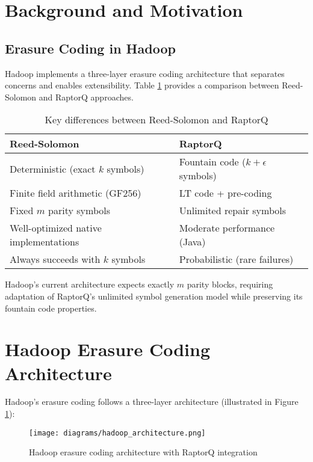 \documentclass{article}
\begin{document}
\section{Background and Motivation}

\subsection{Erasure Coding in Hadoop}

Hadoop implements a three-layer erasure coding architecture that separates concerns and enables extensibility. Table \ref{tab:comparison} provides a comparison between Reed-Solomon and RaptorQ approaches.

\begin{table}[h]
\centering
\begin{tabular}{|p{5cm}|p{5cm}|}
\hline
\textbf{Reed-Solomon} & \textbf{RaptorQ} \\\hline
Deterministic (exact $k$ symbols) & Fountain code ($k+\epsilon$ symbols) \\\hline
Finite field arithmetic (GF256) & LT code + pre-coding \\\hline
Fixed $m$ parity symbols & Unlimited repair symbols \\\hline
Well-optimized native implementations & Moderate performance (Java) \\\hline
Always succeeds with $k$ symbols & Probabilistic (rare failures) \\\hline
\end{tabular}
\caption{\label{tab:comparison}Key differences between Reed-Solomon and RaptorQ}
\end{table}

Hadoop's current architecture expects exactly $m$ parity blocks, requiring adaptation of RaptorQ's unlimited symbol generation model while preserving its fountain code properties.

\section{Hadoop Erasure Coding Architecture}

Hadoop's erasure coding follows a three-layer architecture (illustrated in Figure \ref{fig:architecture}):

\begin{figure}[h]
\centering
\texttt{[image: diagrams/hadoop\_architecture.png]}
\caption{\label{fig:architecture}Hadoop erasure coding architecture with RaptorQ integration}
\end{figure}
\end{document}

